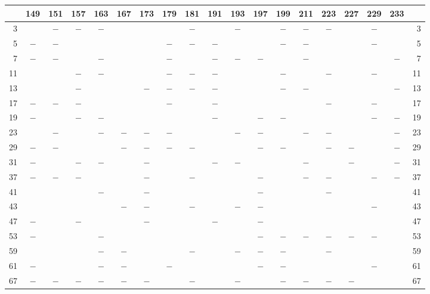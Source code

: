 \clearpage
{}%
\begin{center}\begingroup\fontsize{8}{10.5}\selectfont\setlength{\tabcolsep}{2pt}
\begin{tabular}{r|c|c|c|c|c|c|c|c|c|c|c|c|c|c|c|c|c|r}
\hline
 & 149 & 151 & 157 & 163 & 167 & 173 & 179 & 181 & 191 & 193 & 197 & 199 & 211 & 223 & 227 & 229 & 233 & \\
\hline
3 &  & $-$ & $-$ & $-$ &  &  &  & $-$ &  & $-$ &  & $-$ & $-$ & $-$ &  & $-$ &  & 3\\
5 & $-$ & $-$ &  &  &  &  & $-$ & $-$ & $-$ &  &  & $-$ & $-$ &  &  & $-$ &  & 5\\
7 & $-$ & $-$ &  & $-$ &  &  & $-$ &  & $-$ & $-$ & $-$ &  & $-$ &  &  &  & $-$ & 7\\
11 &  &  & $-$ & $-$ &  &  & $-$ & $-$ & $-$ &  &  & $-$ &  & $-$ &  & $-$ &  & 11\\
13 &  &  & $-$ &  &  & $-$ & $-$ & $-$ & $-$ &  &  & $-$ & $-$ &  &  &  & $-$ & 13\\
17 & $-$ & $-$ & $-$ &  &  &  & $-$ &  & $-$ &  &  &  &  & $-$ &  & $-$ &  & 17\\
19 & $-$ &  & $-$ & $-$ &  &  &  &  & $-$ &  & $-$ & $-$ &  &  &  & $-$ & $-$ & 19\\
23 &  & $-$ &  & $-$ & $-$ & $-$ & $-$ &  &  & $-$ & $-$ &  & $-$ & $-$ &  &  & $-$ & 23\\
29 & $-$ & $-$ &  &  & $-$ & $-$ & $-$ & $-$ &  &  & $-$ & $-$ &  & $-$ & $-$ &  & $-$ & 29\\
31 & $-$ &  & $-$ & $-$ &  & $-$ &  &  & $-$ & $-$ &  &  & $-$ &  & $-$ &  & $-$ & 31\\
37 & $-$ & $-$ & $-$ &  &  & $-$ &  & $-$ &  &  & $-$ &  & $-$ & $-$ &  & $-$ & $-$ & 37\\
41 &  &  &  & $-$ &  & $-$ &  &  &  &  & $-$ &  &  & $-$ &  &  &  & 41\\
43 &  &  &  &  & $-$ & $-$ &  & $-$ &  & $-$ & $-$ &  &  &  &  & $-$ &  & 43\\
47 & $-$ &  & $-$ &  &  & $-$ &  &  & $-$ &  & $-$ &  &  &  &  &  &  & 47\\
53 & $-$ &  &  & $-$ &  &  &  &  &  &  & $-$ & $-$ & $-$ & $-$ & $-$ & $-$ &  & 53\\
59 &  &  &  & $-$ & $-$ &  &  & $-$ &  & $-$ & $-$ & $-$ &  & $-$ &  &  &  & 59\\
61 & $-$ &  &  & $-$ & $-$ &  & $-$ &  &  &  & $-$ & $-$ &  &  &  & $-$ &  & 61\\
67 & $-$ & $-$ & $-$ & $-$ & $-$ & $-$ &  & $-$ &  & $-$ &  & $-$ & $-$ & $-$ & $-$ &  &  & 67\\

\end{tabular}
\end{center}
